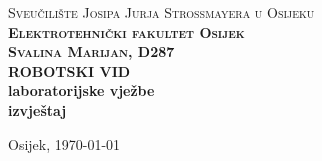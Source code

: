 \newpage
\begin{titlepage}
\begin{center}
\newcommand{\HRule}[1]{\rule{\linewidth}{#1}}

\textsc{Sveučilište Josipa Jurja Strossmayera u Osijeku}\\[0.2cm]
\textbf{\textsc{Elektrotehnički fakultet Osijek}}\\[4.5cm]


{\large \bfseries \textsc{Svalina Marijan, D287} \\ [1 cm] } 
{\LARGE \bfseries \color{MidnightBlue} 
ROBOTSKI VID \\ laboratorijske vježbe \\ [0.5cm] }
{\large \bfseries izvještaj} \\ [0.2cm]


\vfill

\begin{minipage}{0.4\textwidth}
\begin{center} \large
Osijek, \today \\
\end{center}


\end{minipage}
\end{center}
\end{titlepage}
\newpage
\renewcommand{\cftsecleader}{\cftdotfill{\cftdotsep}}
\tableofcontents 
\thispagestyle{empty}

\newpage
\setcounter{page}{1}
